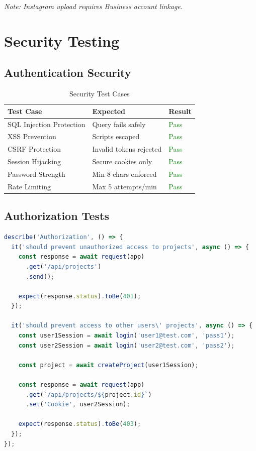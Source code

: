 \textit{Note: Instagram upload requires Business account linkage.}

\section{Security Testing}

\subsection{Authentication Security}

\begin{table}[H]
\centering
\caption{Security Test Cases}
\begin{tabular}{@{}lll@{}}
\toprule
\textbf{Test Case} & \textbf{Expected} & \textbf{Result} \\
\midrule
SQL Injection Protection & Query fails safely & \textcolor{green}{Pass} \\
XSS Prevention & Scripts escaped & \textcolor{green}{Pass} \\
CSRF Protection & Invalid tokens rejected & \textcolor{green}{Pass} \\
Session Hijacking & Secure cookies only & \textcolor{green}{Pass} \\
Password Strength & Min 8 chars enforced & \textcolor{green}{Pass} \\
Rate Limiting & Max 5 attempts/min & \textcolor{green}{Pass} \\
\bottomrule
\end{tabular}
\end{table}

\subsection{Authorization Tests}

\begin{lstlisting}[language=JavaScript, caption=Authorization Tests]
describe('Authorization', () => {
  it('should prevent unauthorized access to projects', async () => {
    const response = await request(app)
      .get('/api/projects')
      .send();
    
    expect(response.status).toBe(401);
  });
  
  it('should prevent access to other users\' projects', async () => {
    const user1Session = await login('user1@test.com', 'pass1');
    const user2Session = await login('user2@test.com', 'pass2');
    
    const project = await createProject(user1Session);
    
    const response = await request(app)
      .get(`/api/projects/${project.id}`)
      .set('Cookie', user2Session);
    
    expect(response.status).toBe(403);
  });
});
\end{lstlisting}


